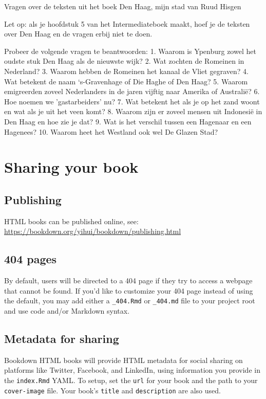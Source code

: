 \documentclass[
  a4paper,
]{book}
\begin{document}
Vragen over de teksten uit het boek Den Haag, mijn stad van Ruud Hisgen

Let op: als je hoofdstuk 5 van het Intermediateboek maakt, hoef je de teksten over Den Haag en de vragen erbij niet te doen.

Probeer de volgende vragen te beantwoorden:
1. Waarom is Ypenburg zowel het oudste stuk Den Haag als de nieuwste wijk?
2. Wat zochten de Romeinen in Nederland?
3. Waarom hebben de Romeinen het kanaal de Vliet gegraven?
4. Wat betekent de naam `s-Gravenhage of Die Haghe of Den Haag?
5. Waarom emigreerden zoveel Nederlanders in de jaren vijftig naar Amerika of Australië?
6. Hoe noemen we 'gastarbeiders' nu?
7. Wat betekent het als je op het zand woont en wat als je uit het veen komt?
8. Waarom zijn er zoveel mensen uit Indonesië in Den Haag en hoe zie je dat?
9. Wat is het verschil tussen een Hagenaar en een Hagenees?
10. Waarom heet het Westland ook wel De Glazen Stad?

\hypertarget{sharing-your-book}{%
\chapter{Sharing your book}\label{sharing-your-book}}

\hypertarget{publishing}{%
\section{Publishing}\label{publishing}}

HTML books can be published online, see: \url{https://bookdown.org/yihui/bookdown/publishing.html}

\hypertarget{pages}{%
\section{404 pages}\label{pages}}

By default, users will be directed to a 404 page if they try to access a webpage that cannot be found. If you'd like to customize your 404 page instead of using the default, you may add either a \texttt{\_404.Rmd} or \texttt{\_404.md} file to your project root and use code and/or Markdown syntax.

\hypertarget{metadata-for-sharing}{%
\section{Metadata for sharing}\label{metadata-for-sharing}}

Bookdown HTML books will provide HTML metadata for social sharing on platforms like Twitter, Facebook, and LinkedIn, using information you provide in the \texttt{index.Rmd} YAML. To setup, set the \texttt{url} for your book and the path to your \texttt{cover-image} file. Your book's \texttt{title} and \texttt{description} are also used.
\end{document}
